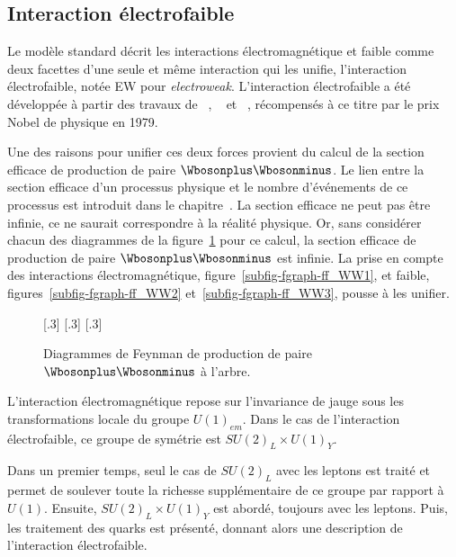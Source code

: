\subsection{Interaction électrofaible}\label{chapter-MS-MSSM-section-formalisme-subsec-EW}
Le modèle standard décrit les interactions électromagnétique et faible comme deux facettes d'une seule et même interaction qui les unifie, l'interaction électrofaible, notée \og EW \fg{} pour \emph{electroweak}.
L'interaction électrofaible a été développée à partir des travaux de \citeauthor{Glashow_EW}~\cite{Glashow_EW}, \citeauthor{Salam_EW}~\cite{Salam_EW} et \citeauthor{Weinberg_leptons_model}~\cite{Weinberg_leptons_model}, récompensés à ce titre par le prix Nobel de physique en 1979.
\par Une des raisons pour unifier ces deux forces provient du calcul de la section efficace de production de paire $\Wbosonplus\Wbosonminus$.
Le lien entre la section efficace d'un processus physique et le nombre d'événements de ce processus est introduit dans le chapitre~.
La section efficace ne peut pas être infinie, ce ne saurait correspondre à la réalité physique.
Or, sans considérer chacun des diagrammes de la figure~\ref{fig-fgraph-ff_WW} pour ce calcul,
la section efficace de production de paire $\Wbosonplus\Wbosonminus$ est infinie.
La prise en compte des interactions électromagnétique, figure~\ref{subfig-fgraph-ff_WW1},
et faible, figures~\ref{subfig-fgraph-ff_WW2} et~\ref{subfig-fgraph-ff_WW3},
pousse à les unifier.
\begin{figure}[h]
\centering
\vspace{\baselineskip}
\subcaptionbox{\label{subfig-fgraph-ff_WW1}}[.3\textwidth]
{\vspace{\baselineskip}}
\hfill
\subcaptionbox{\label{subfig-fgraph-ff_WW2}}[.3\textwidth]
{\vspace{\baselineskip}}
\hfill
\subcaptionbox{\label{subfig-fgraph-ff_WW3}}[.3\textwidth]
{\vspace{\baselineskip}}

\caption{Diagrammes de Feynman de production de paire $\Wbosonplus\Wbosonminus$ à l'arbre.}
\label{fig-fgraph-ff_WW}
\end{figure}
\par L'interaction électromagnétique repose sur l'invariance de jauge sous les transformations locale du groupe $U(1)_{em}$.
Dans le cas de l'interaction électrofaible, ce groupe de symétrie est $SU(2)_L \times U(1)_Y$.
\par
Dans un premier temps, seul le cas de $SU(2)_L$ avec les leptons est traité et permet de soulever toute la richesse supplémentaire de ce groupe par rapport à $U(1)$.
Ensuite, $SU(2)_L \times U(1)_Y$ est abordé, toujours avec les leptons.
Puis, les traitement des quarks est présenté, donnant alors une description de l'interaction électrofaible.
